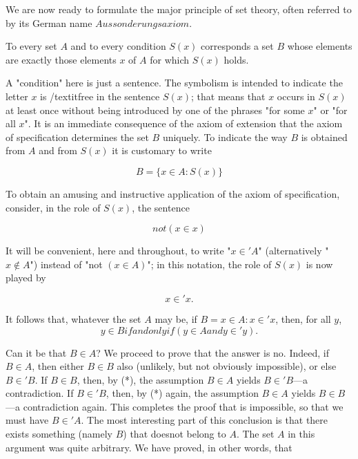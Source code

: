 We are now ready to formulate the major principle of set theory, often referred to by its German name $Aussonderungsaxiom$. 

\begin{named} To every set $A$ and to every condition $S(x)$ corresponds a set $B$ whose elements are exactly those elements $x$ of $A$ for which $S(x)$ holds.
\end{named}

A "condition" here is just a sentence. The symbolism is intended to indicate the letter $x$ is /textit{free} in the sentence $S(x)$; that means that $x$ occurs in $S(x)$ at least once without being introduced by one of the phrases "for some $x$" or "for all $x$". It is an immediate consequence of the axiom of extension that the axiom of specification determines the set $B$ uniquely. To indicate the way $B$ is obtained from $A$ and from $S(x)$ it is customary to write 

\begin{equation*}
B  = \{ x \in A: S(x) \} 
\end{equation*}

To obtain an amusing and instructive application of the axiom of specification, consider, in the role of $S(x)$, the sentence

\begin{equation*}
not (x \in x)
\end{equation*}

It will be convenient, here and throughout, to write "$x \in '  A$" (alternatively "$ x \notin A $") instead of "not $(x \in A)$"; in this notation, the role of $S(x)$ is now played by

\begin{equation*}
x \in ' x.
\end{equation*}

It follows that, whatever the set $A$ may be, if $B = {x \in A: x \in ' x}$, then, for all $y$,
\begin{equation*}
y \in B if and only if ( y \in A and y \in ' y).
\end{equation*}

Can it be that $B \in A$? We proceed to prove that the answer is no. Indeed, if $B \in A$, then either $B \in B$ also (unlikely, but not obviously impossible), or else $B \in ' B$. If $B \in B$, then, by (*), the assumption $B \in A$ yields $B \in ' B$—a contradiction. If $B \in ' B$, then, by (*) again, the assumption $B \in A$ yields $B \in B$—a contradiction again. This completes the proof that is impossible, so that we must have $B \in ' A$. The most interesting part of this conclusion is that there exists something (namely $B$) that doesnot belong to $A$. The set $A$ in this argument was quite arbitrary. We have proved, in other words, that 

